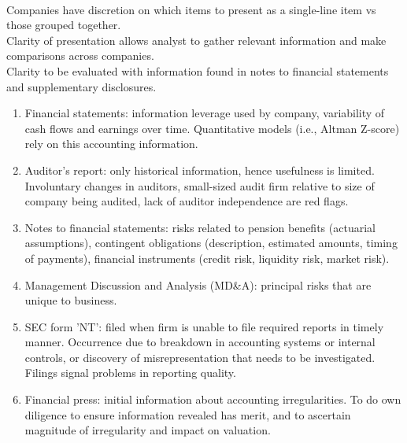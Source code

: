 \begin{remark}  \\
Companies have discretion on which items to present as a single-line item vs those grouped together.\\
Clarity of presentation allows analyst to gather relevant information and make comparisons across companies.\\
Clarity to be evaluated with information found in notes to financial statements and supplementary disclosures.
\end{remark}

\begin{remark} 
\begin{enumerate}[label=\roman*.]
\setlength{\itemsep}{0pt}
\item Financial statements: information leverage used by company, variability of cash flows and earnings over time. Quantitative models (i.e., Altman Z-score) rely on this accounting information.
\item Auditor's report: only historical information, hence usefulness is limited. Involuntary changes in auditors, small-sized audit firm relative to size of company being audited, lack of auditor independence are red flags.
\item Notes to financial statements: risks related to pension benefits (actuarial assumptions), contingent obligations (description, estimated amounts, timing of payments), financial instruments (credit risk, liquidity risk, market risk).
\item Management Discussion and Analysis (MD\&A): principal risks that are unique to business.
\item SEC form 'NT': filed when firm is unable to file required reports in timely manner. Occurrence due to breakdown in accounting systems or internal controls, or discovery of misrepresentation that needs to be investigated. Filings signal problems in reporting quality.
\item Financial press: initial information about accounting irregularities. To do own diligence to ensure information revealed has merit, and to ascertain magnitude of irregularity and impact on valuation.
\end{enumerate}
\end{remark}

